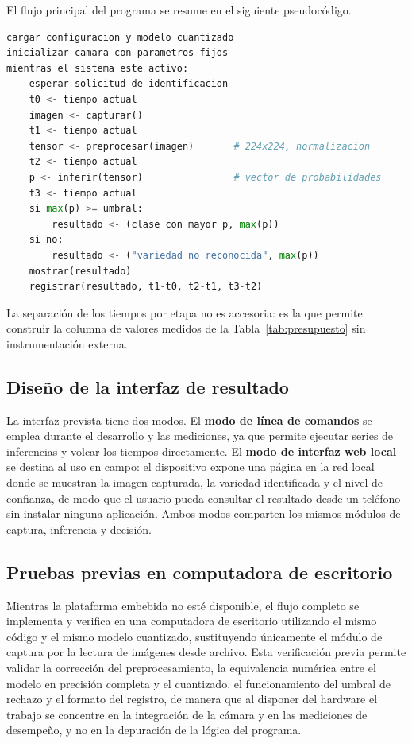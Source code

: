 El flujo principal del programa se resume en el siguiente pseudocódigo.

\begin{lstlisting}[language=Python, caption={Flujo principal del programa de
inferencia.}, label={lst:flujo}]
cargar configuracion y modelo cuantizado
inicializar camara con parametros fijos
mientras el sistema este activo:
    esperar solicitud de identificacion
    t0 <- tiempo actual
    imagen <- capturar()
    t1 <- tiempo actual
    tensor <- preprocesar(imagen)       # 224x224, normalizacion
    t2 <- tiempo actual
    p <- inferir(tensor)                # vector de probabilidades
    t3 <- tiempo actual
    si max(p) >= umbral:
        resultado <- (clase con mayor p, max(p))
    si no:
        resultado <- ("variedad no reconocida", max(p))
    mostrar(resultado)
    registrar(resultado, t1-t0, t2-t1, t3-t2)
\end{lstlisting}

La separación de los tiempos por etapa no es accesoria: es la que permite
construir la columna de valores medidos de la
Tabla~\ref{tab:presupuesto} sin instrumentación externa.

\subsection{Diseño de la interfaz de resultado}

La interfaz prevista tiene dos modos. El \textbf{modo de línea de comandos}
se emplea durante el desarrollo y las mediciones, ya que permite ejecutar
series de inferencias y volcar los tiempos directamente. El \textbf{modo de
interfaz web local} se destina al uso en campo: el dispositivo expone una
página en la red local donde se muestran la imagen capturada, la variedad
identificada y el nivel de confianza, de modo que el usuario pueda consultar
el resultado desde un teléfono sin instalar ninguna aplicación. Ambos modos
comparten los mismos módulos de captura, inferencia y decisión.

\subsection{Pruebas previas en computadora de escritorio}

Mientras la plataforma embebida no esté disponible, el flujo completo se
implementa y verifica en una computadora de escritorio utilizando el mismo
código y el mismo modelo cuantizado, sustituyendo únicamente el módulo de
captura por la lectura de imágenes desde archivo. Esta verificación previa
permite validar la corrección del preprocesamiento, la equivalencia numérica
entre el modelo en precisión completa y el cuantizado, el funcionamiento del
umbral de rechazo y el formato del registro, de manera que al disponer del
hardware el trabajo se concentre en la integración de la cámara y en las
mediciones de desempeño, y no en la depuración de la lógica del programa.

